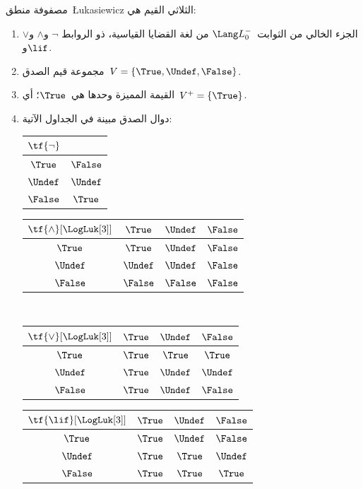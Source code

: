 \documentclass[../../../include/open-logic-section]{subfiles}
\begin{document}
\begin{defn}
مصفوفة منطق~\L ukasiewicz الثلاثي القيم هي:
\begin{enumerate}
  \item الجزء الخالي من الثوابت~$\Lang L_0^{-}$ من لغة القضايا القياسية، ذو الروابط
  $\lnot$ و$\land$ و$\lor$ و$\lif$.
  \item مجموعة قيم الصدق~$V = \{\True, \Undef, \False\}$.
  \item القيمة المميزة وحدها هي~$\True$؛ أي~$V^+ = \{\True\}$.
  \item دوال الصدق مبينة في الجداول الآتية:
  \begin{center}
    \begin{tabular}{c|c}
      $\tf{\lnot}$ & \\
      \hline
      $\True$ & $\False$ \\
      $\Undef$ & $\Undef$ \\
      $\False$ & $\True$
    \end{tabular}
    \quad
    \begin{tabular}{c|ccc}
      $\tf{\land}[\LogLuk[3]]$ & $\True$ & $\Undef$ & $\False$ \\
      \hline
      $\True$ & $\True$ & $\Undef$ & $\False$ \\
      $\Undef$ & $\Undef$ & $\Undef$ & $\False$\\
      $\False$ & $\False$ & $\False$ & $\False$
    \end{tabular}
    \\[2ex]
    \begin{tabular}{c|ccc}
      $\tf{\lor}[\LogLuk[3]]$ & $\True$ & $\Undef$ & $\False$ \\
      \hline
      $\True$ & $\True$ & $\True$ & $\True$ \\
      $\Undef$ & $\True$ & $\Undef$ & $\Undef$ \\
      $\False$ & $\True$ & $\Undef$ & $\False$
    \end{tabular}
    \quad
    \begin{tabular}{c|ccc}
      $\tf{\lif}[\LogLuk[3]]$ & $\True$ & $\Undef$ & $\False$ \\
      \hline
      $\True$ & $\True$ & $\Undef$ & $\False$ \\
      $\Undef$ & $\True$ & $\True$ & $\Undef$  \\
      $\False$ & $\True$ & $\True$ & $\True$
    \end{tabular}
  \end{center}
\end{enumerate}
\end{defn}
\end{document}
